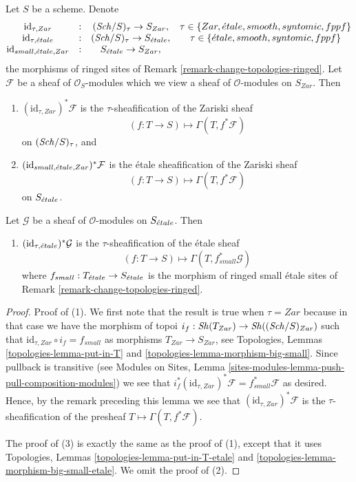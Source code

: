 \begin{lemma}
\label{lemma-compare-sites}
Let $S$ be a scheme. Denote
$$
\begin{matrix}
\text{id}_{\tau, Zar} & : & (\mathit{Sch}/S)_\tau \to S_{Zar}, &
\tau \in \{Zar, {\acute{e}tale}, smooth, syntomic, fppf\} \\
\text{id}_{\tau, {\acute{e}tale}} & : &
(\mathit{Sch}/S)_\tau \to S_{\acute{e}tale}, &
\tau \in \{{\acute{e}tale}, smooth, syntomic, fppf\} \\
\text{id}_{small, {\acute{e}tale}, Zar} & : & S_{\acute{e}tale} \to S_{Zar},
\end{matrix}
$$
the morphisms of ringed sites of
Remark \ref{remark-change-topologies-ringed}.
Let $\mathcal{F}$ be a sheaf of $\mathcal{O}_S$-modules
which we view a sheaf of $\mathcal{O}$-modules on $S_{Zar}$. Then
\begin{enumerate}
\item $(\text{id}_{\tau, Zar})^*\mathcal{F}$ is the $\tau$-sheafification
of the Zariski sheaf
$$
(f : T \to S) \longmapsto \Gamma(T, f^*\mathcal{F})
$$
on $(\mathit{Sch}/S)_\tau$, and
\item $(\text{id}_{small, {\acute{e}tale}, Zar})^*\mathcal{F}$ is the
\'etale sheafification of the Zariski sheaf
$$
(f : T \to S) \longmapsto \Gamma(T, f^*\mathcal{F})
$$
on $S_{\acute{e}tale}$.
\end{enumerate}
Let $\mathcal{G}$ be a sheaf of $\mathcal{O}$-modules
on $S_{\acute{e}tale}$. Then
\begin{enumerate}
\item[(3)] $(\text{id}_{\tau, {\acute{e}tale}})^*\mathcal{G}$ is the
$\tau$-sheafification of the \'etale sheaf
$$
(f : T \to S) \longmapsto \Gamma(T, f_{small}^*\mathcal{G})
$$
where $f_{small} : T_{\acute{e}tale} \to S_{\acute{e}tale}$
is the morphism of ringed small \'etale sites of
Remark \ref{remark-change-topologies-ringed}.
\end{enumerate}
\end{lemma}

\begin{proof}
Proof of (1). We first note that the result is true when $\tau = Zar$
because in that case we have the morphism of topoi
$i_f : \mathop{\mathit{Sh}}\nolimits(T_{Zar}) \to \mathop{\mathit{Sh}}\nolimits((\mathit{Sch}/S)_{Zar})$
such that $\text{id}_{\tau, Zar} \circ i_f = f_{small}$ as morphisms
$T_{Zar} \to S_{Zar}$, see
Topologies, Lemmas \ref{topologies-lemma-put-in-T} and
\ref{topologies-lemma-morphism-big-small}.
Since pullback is transitive (see
Modules on Sites,
Lemma \ref{sites-modules-lemma-push-pull-composition-modules})
we see that
$i_f^*(\text{id}_{\tau, Zar})^*\mathcal{F} = f_{small}^*\mathcal{F}$
as desired. Hence, by the remark preceding this lemma we see that
$(\text{id}_{\tau, Zar})^*\mathcal{F}$ is the $\tau$-sheafification of
the presheaf $T \mapsto \Gamma(T, f^*\mathcal{F})$.

\medskip\noindent
The proof of (3) is exactly the same as the proof of (1), except that it
uses
Topologies, Lemmas \ref{topologies-lemma-put-in-T-etale} and
\ref{topologies-lemma-morphism-big-small-etale}.
We omit the proof of (2).
\end{proof}

